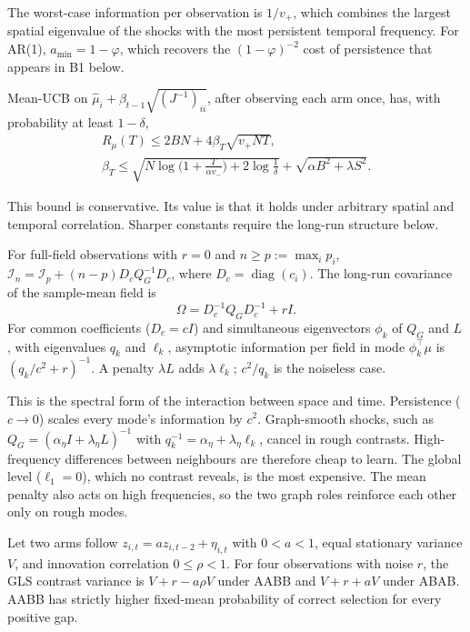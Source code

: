 \documentclass[sigconf,review,anonymous]{acmart}
\newcommand{\diag}{\operatorname{diag}}
\newcommand{\I}{\mathcal{I}}
\begin{document}
The worst-case information per observation is $1/v_+$, which combines the largest spatial eigenvalue of the shocks with the most persistent temporal frequency. For AR(1), $a_{\min}=1-\varphi$, which recovers the $(1-\varphi)^{-2}$ cost of persistence that appears in B1 below.

\begin{corollary}\label{cor:ucb}
Mean-UCB on $\hat\mu_i+\beta_{t-1}\sqrt{(J^{-1})_{ii}}$, after observing each arm once, has, with probability at least $1-\delta$,
\begin{gather*}
R_\mu(T)\le2BN+4\beta_T\sqrt{v_+NT},\\
\beta_T\le\sqrt{N\log\big(1+\tfrac{T}{\alpha v_-}\big)+2\log\tfrac1\delta}+\sqrt{\alpha B^2+\lambda S^2}.
\end{gather*}
\end{corollary}

This bound is conservative. Its value is that it holds under arbitrary spatial and temporal correlation. Sharper constants require the long-run structure below.

\begin{proposition}\label{prop:lr}
For full-field observations with $r=0$ and $n\ge p:=\max_i p_i$, $\I_n=\I_p+(n-p)D_cQ_G^{-1}D_c$, where $D_c=\diag(c_i)$. The long-run covariance of the sample-mean field is
\[
\Omega=D_c^{-1}Q_GD_c^{-1}+rI.
\]
For common coefficients ($D_c=cI$) and simultaneous eigenvectors $\phi_k$ of $Q_G$ and $L$, with eigenvalues $q_k$ and $\ell_k$, asymptotic information per field in mode $\phi_k^\top\mu$ is $(q_k/c^2+r)^{-1}$. A penalty $\lambda L$ adds $\lambda\ell_k$; $c^2/q_k$ is the noiseless case.
\end{proposition}

This is the spectral form of the interaction between space and time. Persistence ($c\to0$) scales every mode's information by $c^2$. Graph-smooth shocks, such as $Q_G=(\alpha_\eta I+\lambda_\eta L)^{-1}$ with $q_k^{-1}=\alpha_\eta+\lambda_\eta\ell_k$, cancel in rough contrasts. High-frequency differences between neighbours are therefore cheap to learn. The global level ($\ell_1=0$), which no contrast reveals, is the most expensive. The mean penalty also acts on high frequencies, so the two graph roles reinforce each other only on rough modes.

\begin{proposition}\label{prop:ar2}
Let two arms follow $z_{i,t}=az_{i,t-2}+\eta_{i,t}$ with $0<a<1$, equal stationary variance $V$, and innovation correlation $0\le\rho<1$. For four observations with noise $r$, the GLS contrast variance is $V+r-a\rho V$ under AABB and $V+r+aV$ under ABAB. AABB has strictly higher fixed-mean probability of correct selection for every positive gap.
\end{proposition}
\end{document}
